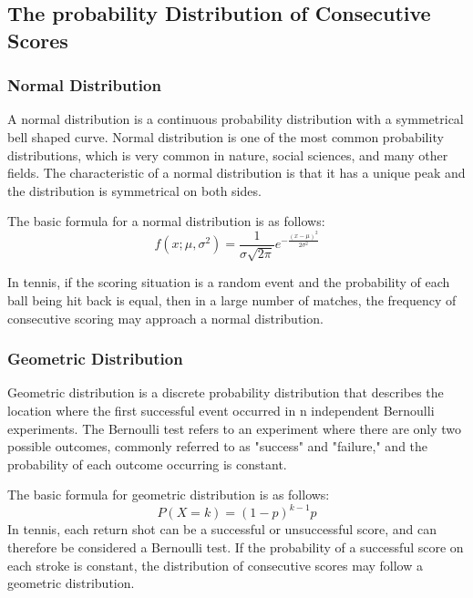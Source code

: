 \documentclass{mcmthesis}
\begin{document}
\subsection{The probability Distribution of Consecutive Scores}
\subsubsection{Normal Distribution}
A normal distribution is a continuous probability distribution with a symmetrical bell shaped curve. Normal distribution is one of the most common probability distributions, which is very common in nature, social sciences, and many other fields. The characteristic of a normal distribution is that it has a unique peak and the distribution is symmetrical on both sides.

The basic formula for a normal distribution is as follows:\[
	f\left(x ; \mu, \sigma^{2}\right)=\frac{1}{\sigma \sqrt{2 \pi}} e^{-\frac{(x-\mu)^{2}}{2 \sigma^{2}}}
\]

In tennis, if the scoring situation is a random event and the probability of each ball being hit back is equal, then in a large number of matches, the frequency of consecutive scoring may approach a normal distribution.

\subsubsection{Geometric Distribution}
Geometric distribution is a discrete probability distribution that describes the location where the first successful event occurred in n independent Bernoulli experiments. The Bernoulli test refers to an experiment where there are only two possible outcomes, commonly referred to as "success" and "failure," and the probability of each outcome occurring is constant.

The basic formula for geometric distribution is as follows:
\[
	P(X=k)=(1-p)^{k-1} p
\]
In tennis, each return shot can be a successful or unsuccessful score, and can therefore be considered a Bernoulli test. If the probability of a successful score on each stroke is constant, the distribution of consecutive scores may follow a geometric distribution.
\end{document}
